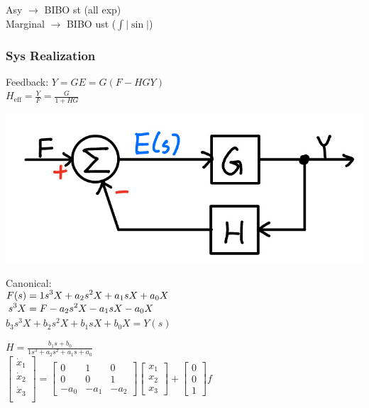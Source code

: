 \documentclass[4pt]{article}
\theoremstyle{definition}
\theoremstyle{definition}
\begin{document}
\begin{landscape}
\begin{multicols}{3}
    Asy $\rightarrow$ BIBO st (all exp)\\                                %
    Marginal $\rightarrow$ BIBO ust ($\int |\sin|$)                            %

\subsubsection*{Sys Realization}         %
    Feedback: \(Y = GE = G(F - HGY)\)\\
    \(H_{\text{eff}} = \frac{Y} F = \frac G {1+HG}\)

    \includegraphics[width=0.5\linewidth]{figures/feedback.jpg}


    Canonical:\\
    \(
    \setlength{\jot}{0pt} 
    \begin{aligned}    
        F(s) &= 1s^3 X + a_2s^2 X + a_1 sX + a_0 X\\      %
        s^3 X &= F - a_2 s^2 X - a_1 sX - a_0 X         %
    \end{aligned}
    \)\\
    \(b_3 s^3 X + b_2 s^2 X + b_1 sX + b_0 X = Y(s)\)

    \(H = \frac{b_1s+b_0}{1s^3+a_2s^2+a_1s+a_0}\)\\     %

    \(
    \begin{bmatrix}
        \dot{x}_1\\
        \dot{x}_2\\
        \dot{x}_3\\
    \end{bmatrix}
    =
    \begin{bmatrix}
        0 & 1 & 0\\
        0 & 0 & 1\\
        -a_0 & -a_1 & -a_2      %
    \end{bmatrix}
    \begin{bmatrix}
        x_1\\
        x_2\\
        x_3
    \end{bmatrix}
    +
    \begin{bmatrix}
        0\\0\\1         %
    \end{bmatrix}
    f
    \)\\


\end{multicols}
\end{landscape}
\end{document}
